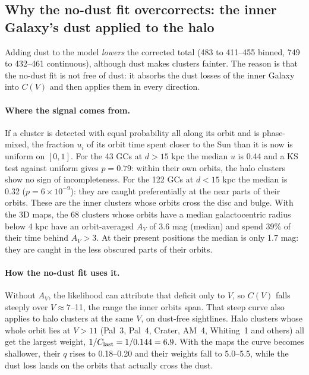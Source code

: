 \documentclass[11pt,a4paper]{article}
\newcommand{\dhel}{d}
\begin{document}
\subsection{Why the no-dust fit overcorrects: the inner Galaxy's dust applied to the halo}
\label{sec:nodustbias}

Adding dust to the model \emph{lowers} the corrected total (483 to 411--455 binned, 749 to 432--461
continuous), although dust makes clusters fainter. The reason is that the no-dust fit is not free of
dust: it absorbs the dust losses of the inner Galaxy into $C(V)$ and then applies them in every
direction.

\paragraph{Where the signal comes from.} If a cluster is detected with equal probability all along
its orbit and is phase-mixed, the fraction $u_i$ of its orbit time spent closer to the Sun than it is
now is uniform on $[0,1]$. For the 43 GCs at $\dhel>15$ kpc the median $u$ is 0.44 and a KS test
against uniform gives $p=0.79$: within their own orbits, the halo clusters show no sign of
incompleteness. For the 122 GCs at $\dhel<15$ kpc the median is 0.32 ($p=6\times10^{-9}$): they are
caught preferentially at the near parts of their orbits. These are the inner clusters whose orbits
cross the disc and bulge. With the 3D maps, the 68 clusters whose orbits have a median galactocentric
radius below 4 kpc have an orbit-averaged $A_V$ of 3.6 mag (median) and spend 39\% of their time
behind $A_V>3$. At their present positions the median is only 1.7 mag: they are caught in the less
obscured parts of their orbits.

\paragraph{How the no-dust fit uses it.} Without $A_V$, the likelihood can attribute that deficit only to
$V$, so $C(V)$ falls steeply over $V\approx7$--11, the range the inner orbits span. That steep curve
also applies to halo clusters at the same $V$, on dust-free sightlines. Halo clusters whose whole orbit
lies at $V>11$ (Pal~3, Pal~4, Crater, AM~4, Whiting~1 and others) all get the largest weight,
$1/C_{\rm last} = 1/0.144 = 6.9$. With the maps the curve becomes shallower, their $q$ rises to
0.18--0.20 and their weights fall to 5.0--5.5, while the dust loss lands on the orbits that actually
cross the dust.
\end{document}
